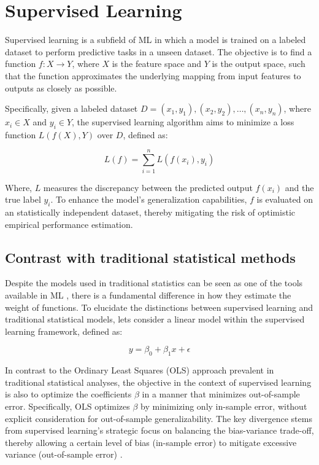 \section{Supervised Learning }

Supervised learning is a subfield of \gls{ML} in which a model is trained on a labeled dataset to perform predictive tasks in a unseen dataset. The objective is to find a function \( f: X \rightarrow Y \), where \( X \) is the feature space and \(Y\) is the output space, such that the function approximates the underlying mapping from input features to outputs as closely as possible.

Specifically, given a labeled dataset \(D = {(x_1, y_1), (x_2, y_2), \ldots, (x_n, y_n)} \), where \( x_i \in X \) and \( y_i \in Y \), the supervised learning algorithm aims to minimize a loss function \( L(f(X), Y) \) over \( D\), defined as:

\[
L(f) = \sum_{i=1}^{n} L(f(x_i), y_i)
\]

Where, \(L\) measures the discrepancy between the predicted output \( f(x_i) \) and the true label \( y_i \). To enhance the model's generalization capabilities, $f$ is evaluated on an statistically independent dataset, thereby mitigating the risk of optimistic empirical performance estimation.

\subsection{Contrast with traditional statistical methods}

Despite the models used in traditional statistics can be seen as one of the tools available in \gls{ML} \cite{TrevorHastieRobertTibshirani2014AssessmentSelection}, there is a fundamental difference in how they estimate the weight of functions. To elucidate the distinctions between supervised learning and traditional statistical models, lets consider a linear model within the supervised learning framework, defined as:

\begin{equation}
y = \beta_0 + \beta_1 x + \epsilon
\label{lm}
\end{equation}

In contrast to the Ordinary Least Squares (OLS) approach prevalent in traditional statistical analyses, the objective in the context of supervised learning is also to optimize the coefficients $\beta$ in a manner that minimizes out-of-sample error. Specifically, OLS optimizes \( \beta \) by minimizing only in-sample error, without explicit consideration for out-of-sample generalizability. The key divergence stems from supervised learning's strategic focus on balancing the bias-variance trade-off, thereby allowing a certain level of bias (in-sample error) to mitigate excessive variance (out-of-sample error) \cite{Athey2019MachineAbout}.

